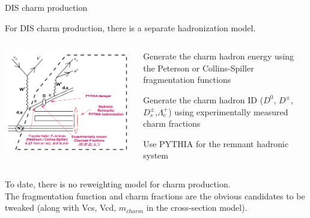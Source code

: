 \begin{frame}{DIS charm production}

For DIS charm production, there is a separate hadronization model.\\

\begin{columns}[T]
  \begin{column}{0.50\textwidth}
     \includegraphics[width=0.98\textwidth]{./images/nuint/dis/charm_hadro.png}
  \end{column}
  \begin{column}{0.50\textwidth}
     \begin{itemize}
     {\small
       \item Generate the charm hadron energy using the Peterson or Collins-Spiller fragmentation functions
       \item Generate the charm hadron ID ($D^{0}$, $D^{\pm}$, $D_{s}^{\pm}$,$\Lambda_{c}^{+}$) using experimentally measured charm fractions
       \item Use PYTHIA for the remnant hadronic system
     }
     \end{itemize}
  \end{column}
\end{columns}
\vspace{0.2cm}
To date, there is no reweighting model for charm production.\\
The fragmentation function and charm fractions are the obvious candidates to be tweaked (along with Vcs, Vcd, $m_{charm}$ in the cross-section model).\\
\end{frame}


